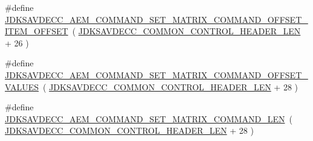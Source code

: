 \begin{DoxyCompactItemize}
\item 
\#define \hyperlink{group__command__set__matrix_ga61cd64d417ee4b63443f35691e064a53}{J\+D\+K\+S\+A\+V\+D\+E\+C\+C\+\_\+\+A\+E\+M\+\_\+\+C\+O\+M\+M\+A\+N\+D\+\_\+\+S\+E\+T\+\_\+\+M\+A\+T\+R\+I\+X\+\_\+\+C\+O\+M\+M\+A\+N\+D\+\_\+\+O\+F\+F\+S\+E\+T\+\_\+\+I\+T\+E\+M\+\_\+\+O\+F\+F\+S\+ET}~( \hyperlink{group__jdksavdecc__avtp__common__control__header_gaae84052886fb1bb42f3bc5f85b741dff}{J\+D\+K\+S\+A\+V\+D\+E\+C\+C\+\_\+\+C\+O\+M\+M\+O\+N\+\_\+\+C\+O\+N\+T\+R\+O\+L\+\_\+\+H\+E\+A\+D\+E\+R\+\_\+\+L\+EN} + 26 )
\item 
\#define \hyperlink{group__command__set__matrix_ga07524b48ae064c01c732b41e2bdbb239}{J\+D\+K\+S\+A\+V\+D\+E\+C\+C\+\_\+\+A\+E\+M\+\_\+\+C\+O\+M\+M\+A\+N\+D\+\_\+\+S\+E\+T\+\_\+\+M\+A\+T\+R\+I\+X\+\_\+\+C\+O\+M\+M\+A\+N\+D\+\_\+\+O\+F\+F\+S\+E\+T\+\_\+\+V\+A\+L\+U\+ES}~( \hyperlink{group__jdksavdecc__avtp__common__control__header_gaae84052886fb1bb42f3bc5f85b741dff}{J\+D\+K\+S\+A\+V\+D\+E\+C\+C\+\_\+\+C\+O\+M\+M\+O\+N\+\_\+\+C\+O\+N\+T\+R\+O\+L\+\_\+\+H\+E\+A\+D\+E\+R\+\_\+\+L\+EN} + 28 )
\item 
\#define \hyperlink{group__command__set__matrix_ga5ad958d8f2ee7694dbb39755b4df28c8}{J\+D\+K\+S\+A\+V\+D\+E\+C\+C\+\_\+\+A\+E\+M\+\_\+\+C\+O\+M\+M\+A\+N\+D\+\_\+\+S\+E\+T\+\_\+\+M\+A\+T\+R\+I\+X\+\_\+\+C\+O\+M\+M\+A\+N\+D\+\_\+\+L\+EN}~( \hyperlink{group__jdksavdecc__avtp__common__control__header_gaae84052886fb1bb42f3bc5f85b741dff}{J\+D\+K\+S\+A\+V\+D\+E\+C\+C\+\_\+\+C\+O\+M\+M\+O\+N\+\_\+\+C\+O\+N\+T\+R\+O\+L\+\_\+\+H\+E\+A\+D\+E\+R\+\_\+\+L\+EN} + 28 )
\end{DoxyCompactItemize}
